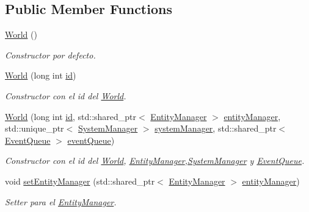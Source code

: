 \subsection*{Public Member Functions}
\begin{DoxyCompactItemize}
\item 
\hyperlink{classant_1_1_world_a81b4833385c832a34a21894969aa3916}{World} ()
\begin{DoxyCompactList}\small\item\em Constructor por defecto. \end{DoxyCompactList}\item 
\hyperlink{classant_1_1_world_a30d503579716ae3c1fc03782afadbdfb}{World} (long int \hyperlink{classant_1_1_world_ac55101558f7c8a7ca6abcf641a4e7b1b}{id})
\begin{DoxyCompactList}\small\item\em Constructor con el id del \hyperlink{classant_1_1_world}{World}. \end{DoxyCompactList}\item 
\hyperlink{classant_1_1_world_ac79dd343b4a71603eb9b87f22865956b}{World} (long int \hyperlink{classant_1_1_world_ac55101558f7c8a7ca6abcf641a4e7b1b}{id}, std\+::shared\+\_\+ptr$<$ \hyperlink{classant_1_1_entity_manager}{Entity\+Manager} $>$ \hyperlink{classant_1_1_world_adc67b8557d684ffb1e029854d795e69d}{entity\+Manager}, std\+::unique\+\_\+ptr$<$ \hyperlink{classant_1_1_system_manager}{System\+Manager} $>$ \hyperlink{classant_1_1_world_afa36ceca0aa8d3ce8e19d6e542fe767e}{system\+Manager}, std\+::shared\+\_\+ptr$<$ \hyperlink{classant_1_1_event_queue}{Event\+Queue} $>$ \hyperlink{classant_1_1_world_ab9634a4cf143a86701367438a989d277}{event\+Queue})
\begin{DoxyCompactList}\small\item\em Constructor con el id del \hyperlink{classant_1_1_world}{World}, \hyperlink{classant_1_1_entity_manager}{Entity\+Manager},\hyperlink{classant_1_1_system_manager}{System\+Manager} y \hyperlink{classant_1_1_event_queue}{Event\+Queue}. \end{DoxyCompactList}\item 
void \hyperlink{classant_1_1_world_a95c3c786b65a35a3eefcef3478f8607e}{set\+Entity\+Manager} (std\+::shared\+\_\+ptr$<$ \hyperlink{classant_1_1_entity_manager}{Entity\+Manager} $>$ \hyperlink{classant_1_1_world_adc67b8557d684ffb1e029854d795e69d}{entity\+Manager})
\begin{DoxyCompactList}\small\item\em Setter para el \hyperlink{classant_1_1_entity_manager}{Entity\+Manager}. \end{DoxyCompactList}\item 

\end{DoxyCompactItemize}

